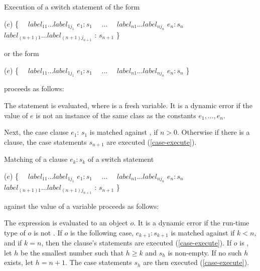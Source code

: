 \documentclass[makeidx]{article}
\begin{document}
{

\LMHash{}%
Execution of a switch statement of the form

\begin{normativeDartCode}
\SWITCH{} ($e$) \{
\ \ $label_{11} \ldots label_{1j_1}$ \CASE{} $e_1: s_1$
\ \ $\ldots$
\ \ $label_{n1} \ldots label_{nj_n}$ \CASE{} $e_n: s_n$
\ \ $label_{(n+1)1} \ldots label_{(n+1)j_{n+1}}$ \DEFAULT{}: $s_{n+1}$
\}
\end{normativeDartCode}

\noindent
or the form

\begin{normativeDartCode}
\SWITCH{} ($e$) \{
\ \ $label_{11} \ldots label_{1j_1}$ \CASE{} $e_1: s_1$
\ \ $\ldots$
\ \ $label_{n1} \ldots label_{nj_n}$ \CASE{} $e_n: s_n$
\}
\end{normativeDartCode}

\noindent
proceeds as follows:

\LMHash{}%
The statement  is evaluated,
where \id{} is a fresh variable.
It is a dynamic error if the value of $e$ is
not an instance of the same class as the constants $e_1, \ldots, e_n$.


\LMHash{}%
Next, the case clause \CASE{} $e_{1}$: $s_{1}$ is matched against \id,
if $n > 0$.
Otherwise if there is a \DEFAULT{} clause,
the case statements $s_{n+1}$ are executed (\ref{case-execute}).

\LMHash{}%
Matching of a \CASE{} clause \CASE{} $e_{k}: s_{k}$ of a switch statement

\begin{normativeDartCode}
\SWITCH{} ($e$) \{
\ \ $label_{11} \ldots label_{1j_1}$ \CASE{} $e_1: s_1$
\ \ $\ldots$
\ \ $label_{n1} \ldots label_{nj_n}$ \CASE{} $e_n: s_n$
\ \ $label_{(n+1)1} \ldots label_{(n+1)j_{n+1}}$ \DEFAULT{}: $s_{n+1}$
\}
\end{normativeDartCode}

\noindent
against the value of a variable \id{} proceeds as follows:

\LMHash{}%
The expression  is evaluated to an object $o$.
It is a dynamic error if the run-time type of $o$ is not .
If $o$ is \FALSE{} the following case,
\CASE{} $e_{k+1}: s_{k+1}$ is matched against \id{} if $k < n$,
and if $k = n$, then the \DEFAULT{} clause's statements are executed
(\ref{case-execute}).
If $o$ is \TRUE, let $h$ be the smallest number
such that $h \ge k$ and $s_h$ is non-empty.
If no such $h$ exists, let $h = n + 1$.
The case statements $s_h$ are then executed (\ref{case-execute}).

}
\end{document}

